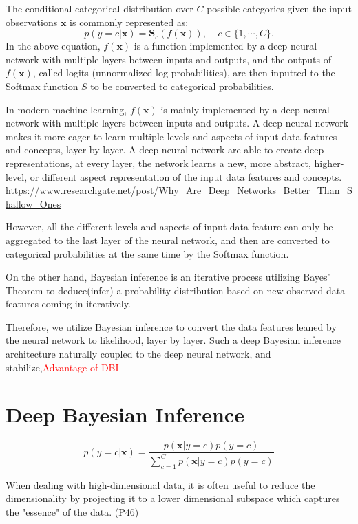 \documentclass{article}
\begin{document}
The conditional categorical distribution over $C$ possible categories given the input observations $\bm{x}$ is commonly represented as:
\begin{equation}
  p(y=c|\bm{x}) = \bm{S}_c(f(\bm{x})), \;\;\;\; c \in \{1,\cdots,C\}.
\end{equation}
In the above equation, $f(\bm{x})$ is a function implemented by a deep neural network with multiple layers between inputs and outputs, and the outputs of $f(\bm{x})$, called logits (unnormalized log-probabilities), are then inputted to the Softmax function $S$ to be converted to categorical probabilities.

In modern machine learning, $f(\bm{x})$ is mainly implemented by a deep neural network with multiple layers between inputs and outputs. A deep neural network makes it more eager to learn multiple levels and aspects of input data features and concepts, layer by layer.
A deep neural network are able to create deep representations, at every layer, the network learns a new, more abstract, higher-level, or different aspect representation of the input data features and concepts.
\url{https://www.researchgate.net/post/Why_Are_Deep_Networks_Better_Than_Shallow_Ones}

However, all the different levels and aspects of input data feature can only be aggregated to the last layer of the neural network, and then are converted to categorical probabilities at the same time by the Softmax function.

On the other hand, Bayesian inference is an iterative process utilizing Bayes' Theorem to deduce(infer) a probability distribution based on new observed data features coming in iteratively.

Therefore, we utilize Bayesian inference to convert the data features leaned by the neural network to likelihood, layer by layer.
Such a deep Bayesian inference architecture naturally coupled to the deep neural network, and stabilize,\textcolor{red}{Advantage of DBI}

\section{Deep Bayesian Inference}



\begin{equation}
  p(y=c|\bm{x}) = \frac{p(\bm{x}|y=c)p(y=c)}{\sum_{c=1}^C p(\bm{x}|y=c)p(y=c)}
\end{equation}


When dealing with high-dimensional data, it is often useful to reduce the dimensionality by projecting it to a lower dimensional subspace which captures the "essence" of the data. (P46)
\end{document}
